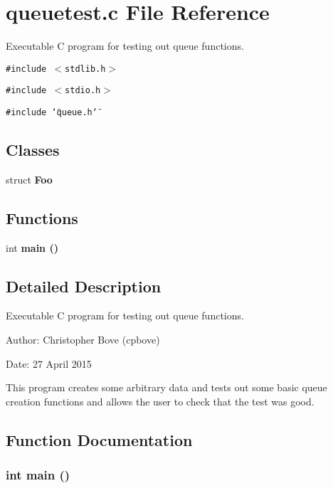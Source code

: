 \section{queuetest.c File Reference}
\label{queuetest_8c}
Executable C program for testing out queue functions. 

{\tt \#include $<$stdlib.h$>$}\par
{\tt \#include $<$stdio.h$>$}\par
{\tt \#include \char`\"{}queue.h\char`\"{}}\par
\subsection*{Classes}
\begin{CompactItemize}
\item 
struct \bf{Foo}
\end{CompactItemize}
\subsection*{Functions}
\begin{CompactItemize}
\item 
int \bf{main} ()
\end{CompactItemize}


\subsection{Detailed Description}
Executable C program for testing out queue functions. 

\begin{Desc}
\item[Author:]Christopher Bove (cpbove) \end{Desc}
\begin{Desc}
\item[Date:]27 April 2015\end{Desc}
This program creates some arbitrary data and tests out some basic queue creation functions and allows the user to check that the test was good. 

\subsection{Function Documentation}
\subsubsection{\setlength{\rightskip}{0pt plus 5cm}int main ()}\label{queuetest_8c_e66f6b31b5ad750f1fe042a706a4e3d4}


